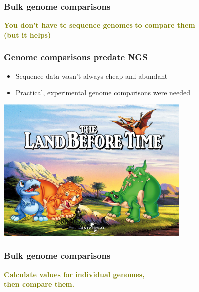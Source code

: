 
%
\begin{frame}
  \frametitle{Bulk genome comparisons}
  \Large{
    \textcolor{olive}{
      \textbf{
      You don't have to sequence genomes to compare them \\
      (but it helps)
      }
    }
  }
\end{frame}

%
\begin{frame}
  \frametitle{Genome comparisons predate NGS}
  \begin{itemize}
    \item Sequence data wasn't always cheap and abundant
    \item Practical, experimental genome comparisons were needed
  \end{itemize}
  \begin{center}
    \includegraphics[width=0.7\textwidth]{images/land_before_time}
  \end{center}  
\end{frame}

%
\begin{frame}
  \frametitle{Bulk genome comparisons}
  \Large{
    \textcolor{olive}{
      \textbf{
      Calculate values for individual genomes, \\
      then compare them.
      }
    }
  }
\end{frame}

